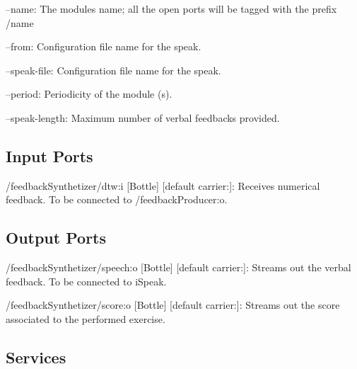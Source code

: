 \begin{DoxyItemize}
\item --name\+: The module\textquotesingle{}s name; all the open ports will be tagged with the prefix /name
\item --from\+: Configuration file name for the speak.
\item --speak-\/file\+: Configuration file name for the speak.
\item --period\+: Periodicity of the module (s).
\item --speak-\/length\+: Maximum number of verbal feedbacks provided. 
\end{DoxyItemize}\hypertarget{group__skeletonViewer_inputports_sec}{}\subsection{Input Ports}\label{group__skeletonViewer_inputports_sec}

\begin{DoxyItemize}
\item /feedback\+Synthetizer/dtw\+:i \mbox{[}Bottle\mbox{]} \mbox{[}default carrier\+:\mbox{]}\+: Receives numerical feedback. To be connected to /feedback\+Producer\+:o.
\end{DoxyItemize}\hypertarget{group__skeletonViewer_outputports_sec}{}\subsection{Output Ports}\label{group__skeletonViewer_outputports_sec}

\begin{DoxyItemize}
\item /feedback\+Synthetizer/speech\+:o \mbox{[}Bottle\mbox{]} \mbox{[}default carrier\+:\mbox{]}\+: Streams out the verbal feedback. To be connected to i\+Speak.
\item /feedback\+Synthetizer/score\+:o \mbox{[}Bottle\mbox{]} \mbox{[}default carrier\+:\mbox{]}\+: Streams out the score associated to the performed exercise.
\end{DoxyItemize}\hypertarget{group__skeletonViewer_services_sec}{}\subsection{Services}\label{group__skeletonViewer_services_sec}
